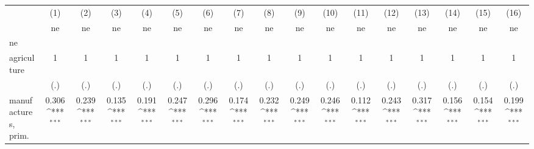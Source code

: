 {
\def\sym#1{\ifmmode^{#1}\else\(^{#1}\)\fi}
\begin{tabular}{l*{16}{c}}
\hline\hline
                    &\multicolumn{1}{c}{(1)}&\multicolumn{1}{c}{(2)}&\multicolumn{1}{c}{(3)}&\multicolumn{1}{c}{(4)}&\multicolumn{1}{c}{(5)}&\multicolumn{1}{c}{(6)}&\multicolumn{1}{c}{(7)}&\multicolumn{1}{c}{(8)}&\multicolumn{1}{c}{(9)}&\multicolumn{1}{c}{(10)}&\multicolumn{1}{c}{(11)}&\multicolumn{1}{c}{(12)}&\multicolumn{1}{c}{(13)}&\multicolumn{1}{c}{(14)}&\multicolumn{1}{c}{(15)}&\multicolumn{1}{c}{(16)}\\
                    &\multicolumn{1}{c}{ne}&\multicolumn{1}{c}{ne}&\multicolumn{1}{c}{ne}&\multicolumn{1}{c}{ne}&\multicolumn{1}{c}{ne}&\multicolumn{1}{c}{ne}&\multicolumn{1}{c}{ne}&\multicolumn{1}{c}{ne}&\multicolumn{1}{c}{ne}&\multicolumn{1}{c}{ne}&\multicolumn{1}{c}{ne}&\multicolumn{1}{c}{ne}&\multicolumn{1}{c}{ne}&\multicolumn{1}{c}{ne}&\multicolumn{1}{c}{ne}&\multicolumn{1}{c}{ne}\\
\hline
ne                  &                     &                     &                     &                     &                     &                     &                     &                     &                     &                     &                     &                     &                     &                     &                     &                     \\
agriculture         &           1         &           1         &           1         &           1         &           1         &           1         &           1         &           1         &           1         &           1         &           1         &           1         &           1         &           1         &           1         &           1         \\
                    &         (.)         &         (.)         &         (.)         &         (.)         &         (.)         &         (.)         &         (.)         &         (.)         &         (.)         &         (.)         &         (.)         &         (.)         &         (.)         &         (.)         &         (.)         &         (.)         \\
[1em]
manufactures, prim. &       0.306\sym{***}&       0.239\sym{***}&       0.135\sym{***}&       0.191\sym{***}&       0.247\sym{***}&       0.296\sym{***}&       0.174\sym{***}&       0.232\sym{***}&       0.249\sym{***}&       0.246\sym{***}&       0.112\sym{***}&       0.243\sym{***}&       0.317\sym{***}&       0.156\sym{***}&       0.154\sym{***}&       0.199\sym{***}\\

\end{tabular}}
